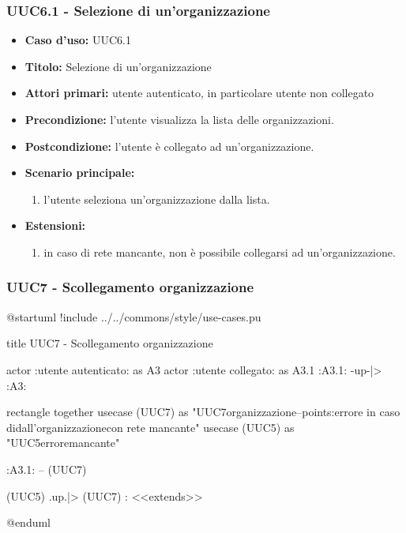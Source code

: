 \documentclass[casi-duso]{subfiles}
\begin{document}
\subsubsection{UUC6.1 - Selezione di un'organizzazione}%
\label{subsub:UUC6.1utente}
\begin{itemize}
  \item \textbf{Caso d’uso:} UUC6.1
  \item \textbf{Titolo:} Selezione di un'organizzazione
  \item \textbf{Attori primari:} utente autenticato, in particolare utente non collegato
  \item \textbf{Precondizione:} l'utente visualizza la lista delle organizzazioni.
  \item \textbf{Postcondizione:} l'utente è collegato ad un'organizzazione.
  \item \textbf{Scenario principale:}
        \begin{enumerate}
          \item l'utente seleziona un'organizzazione dalla lista.
        \end{enumerate}
  \item \textbf{Estensioni:}
        \begin{enumerate}
          \item in caso di rete mancante, non è possibile collegarsi ad un'organizzazione.
        \end{enumerate}
\end{itemize}

\subsubsection{UUC7 - Scollegamento organizzazione}%
\label{subsub:UUC7utente}

\begin{plantuml}
@startuml
!include ../../commons/style/use-cases.pu

title UUC7 - Scollegamento organizzazione

actor :utente autenticato: as A3
actor :utente collegato: as A3.1
:A3.1: -up-|> :A3:

rectangle {
  together {
    usecase (UUC7) as "UUC7\nScollegamento organizzazione\n--\nExtension points:\nVisualizzazione errore in caso di\nscollegamento dall'organizzazione\n con rete mancante"
    usecase (UUC5) as "UUC5\nVisualizzazione errore\nrete mancante"
  }
}

:A3.1: -- (UUC7)

(UUC5) .up.|> (UUC7) : <<extends>>

@enduml  
\end{plantuml}
\end{document}

